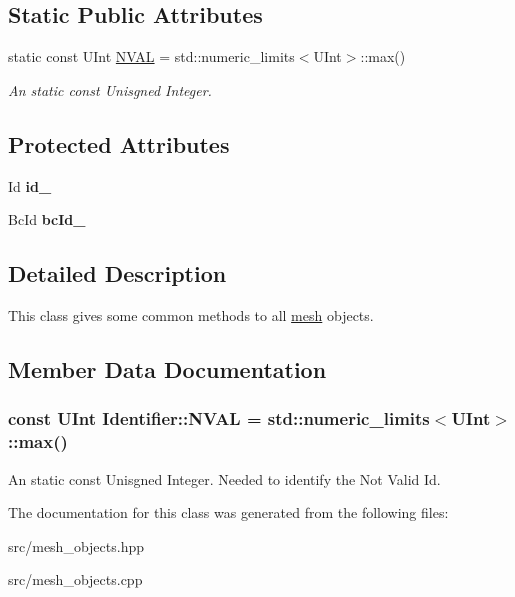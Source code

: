 \subsection*{Static Public Attributes}
\begin{DoxyCompactItemize}
\item 
static const UInt \hyperlink{classIdentifier_a997af66122aaa17d73db9fe9bf9bdf71}{NVAL} = std::numeric\_\-limits$<$UInt$>$::max()
\begin{DoxyCompactList}\small\item\em An static const Unisgned Integer. \item\end{DoxyCompactList}\end{DoxyCompactItemize}
\subsection*{Protected Attributes}
\begin{DoxyCompactItemize}
\item 
\hypertarget{classIdentifier_a97c8576c0d08149eb3c743d9c74082e5}{
Id {\bfseries id\_\-}}
\label{classIdentifier_a97c8576c0d08149eb3c743d9c74082e5}

\item 
\hypertarget{classIdentifier_a946c44b08eb47d3e380a6c72f3f44370}{
BcId {\bfseries bcId\_\-}}
\label{classIdentifier_a946c44b08eb47d3e380a6c72f3f44370}

\end{DoxyCompactItemize}


\subsection{Detailed Description}
This class gives some common methods to all \hyperlink{structmesh}{mesh} objects. 

\subsection{Member Data Documentation}
\hypertarget{classIdentifier_a997af66122aaa17d73db9fe9bf9bdf71}{
\subsubsection[{NVAL}]{\setlength{\rightskip}{0pt plus 5cm}const UInt {\bf Identifier::NVAL} = std::numeric\_\-limits$<$UInt$>$::max()}}
\label{classIdentifier_a997af66122aaa17d73db9fe9bf9bdf71}


An static const Unisgned Integer. Needed to identify the Not Valid Id. 

The documentation for this class was generated from the following files:\begin{DoxyCompactItemize}
\item 
src/mesh\_\-objects.hpp\item 
src/mesh\_\-objects.cpp\end{DoxyCompactItemize}
